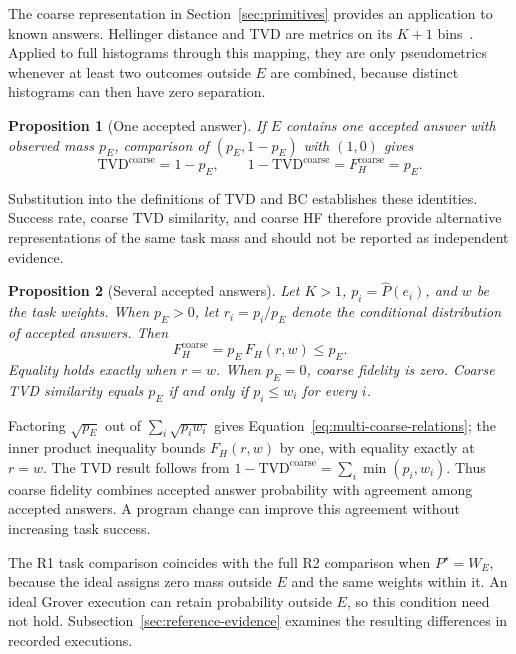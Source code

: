 \documentclass[10pt,conference]{IEEEtran}
\newcommand{\TVD}{\mathrm{TVD}}
\newcommand{\HF}{F_{H}}
\newtheorem{proposition}{Proposition}
\begin{document}
The coarse representation in Section~\ref{sec:primitives} provides an application to known answers. Hellinger distance and TVD are metrics on its $K+1$ bins~\cite{gilchrist2005,nielsen2010}. Applied to full histograms through this mapping, they are only pseudometrics whenever at least two outcomes outside $E$ are combined, because distinct histograms can then have zero separation.

\begin{proposition}[One accepted answer]
\label{prop:k1}
If $E$ contains one accepted answer with observed mass $p_E$, comparison of $(p_E,1-p_E)$ with $(1,0)$ gives
\begin{equation}
\TVD^{\mathrm{coarse}}=1-p_E,
\qquad
1-\TVD^{\mathrm{coarse}}=\HF^{\mathrm{coarse}}=p_E.
\label{eq:k1-coarse-relations}
\end{equation}
\end{proposition}

Substitution into the definitions of TVD and BC establishes these identities. Success rate, coarse TVD similarity, and coarse HF therefore provide alternative representations of the same task mass and should not be reported as independent evidence.

\begin{proposition}[Several accepted answers]
\label{prop:kmulti}
Let $K>1$, $p_i=\widehat P(e_i)$, and $w$ be the task weights. When $p_E>0$, let $r_i=p_i/p_E$ denote the conditional distribution of accepted answers. Then
\begin{equation}
\HF^{\mathrm{coarse}}=p_E\,\HF(r,w)\leq p_E.
\label{eq:multi-coarse-relations}
\end{equation}
Equality holds exactly when $r=w$. When $p_E=0$, coarse fidelity is zero. Coarse TVD similarity equals $p_E$ if and only if $p_i\leq w_i$ for every $i$.
\end{proposition}

Factoring $\sqrt{p_E}$ out of $\sum_i\sqrt{p_iw_i}$ gives Equation~\ref{eq:multi-coarse-relations}; the inner product inequality bounds $\HF(r,w)$ by one, with equality exactly at $r=w$. The TVD result follows from $1-\TVD^{\mathrm{coarse}}=\sum_i\min(p_i,w_i)$. Thus coarse fidelity combines accepted answer probability with agreement among accepted answers. A program change can improve this agreement without increasing task success.

The R1 task comparison coincides with the full R2 comparison when $P^{\star}=W_E$, because the ideal assigns zero mass outside $E$ and the same weights within it. An ideal Grover execution can retain probability outside $E$, so this condition need not hold. Subsection~\ref{sec:reference-evidence} examines the resulting differences in recorded executions.
\end{document}
